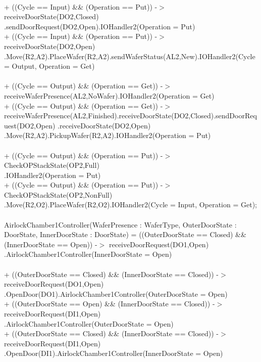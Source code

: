 \documentclass[a4paper,12pt]{article}
\begin{document}
	\\+ ((Cycle == Input) \&\& (Operation == Put)) -$>$ receiveDoorState(DO2,Closed)
	\\.sendDoorRequest(DO2,Open).IOHandler2(Operation = Put)
	\\+ ((Cycle == Input) \&\& (Operation == Put)) -$>$ receiveDoorState(DO2,Open)
	\\.Move(R2,A2).PlaceWafer(R2,A2).sendWaferStatus(AL2,New).IOHandler2(Cycle = Output, Operation = Get)
	\\
	\\+ ((Cycle == Output) \&\& (Operation == Get)) -$>$ receiveWaferPresence(AL2,NoWafer).IOHandler2(Operation = Get)
	\\+ ((Cycle == Output) \&\& (Operation == Get)) -$>$ receiveWaferPresence(AL2,Finished).receiveDoorState(DO2,Closed).sendDoorRequest(DO2,Open)
	.receiveDoorState(DO2,Open)
	\\.Move(R2,A2).PickupWafer(R2,A2).IOHandler2(Operation = Put)
	\\
	\\+ ((Cycle == Output) \&\& (Operation == Put)) -$>$ CheckOPStackState(OP2,Full)
	\\.IOHandler2(Operation = Put)
	\\+ ((Cycle == Output) \&\& (Operation == Put)) -$>$ CheckOPStackState(OP2,NonFull)
	\\.Move(R2,O2).PlaceWafer(R2,O2).IOHandler2(Cycle = Input, Operation = Get);
	\\
	\\AirlockChamber1Controller(WaferPresence : WaferType, OuterDoorState : DoorState, InnerDoorState : DoorState) =
	((OuterDoorState == Closed) \&\& (InnerDoorState == Open)) -$>$ receiveDoorRequest(DO1,Open)
	\\.AirlockChamber1Controller(InnerDoorState = Open)
	\\
	\\+ ((OuterDoorState == Closed) \&\& (InnerDoorState == Closed)) -$>$ receiveDoorRequest(DO1,Open)
	\\.OpenDoor(DO1).AirlockChamber1Controller(OuterDoorState = Open)
	\\+ ((OuterDoorState == Open) \&\& (InnerDoorState == Closed)) -$>$ receiveDoorRequest(DI1,Open)
	\\.AirlockChamber1Controller(OuterDoorState = Open)
	\\+ ((OuterDoorState == Closed) \&\& (InnerDoorState == Closed)) -$>$ receiveDoorRequest(DI1,Open)
	\\.OpenDoor(DI1).AirlockChamber1Controller(InnerDoorState = Open)
\end{document}
